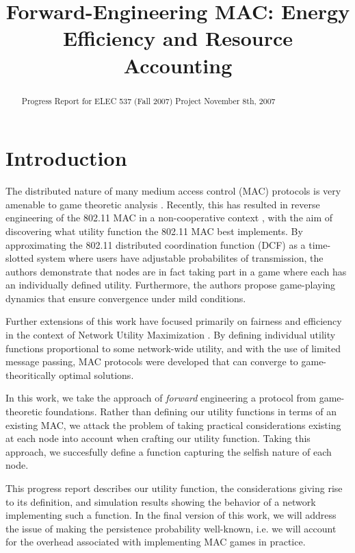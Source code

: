 \documentclass[conference]{IEEEtran}
\theoremstyle{definition}
\begin{document}
\title{Forward-Engineering MAC: Energy Efficiency and Resource Accounting}

\author{
}

\maketitle

\begin{abstract}

Progress Report for ELEC 537 (Fall 2007) Project
November 8th, 2007

\end{abstract}

\section{Introduction}

The distributed nature of many medium access control (MAC) protocols is very amenable to game theoretic analysis \cite{LTHCC07,XSR05}. Recently, this has resulted in reverse engineering of the 802.11 MAC in a non-cooperative context \cite{LTHCC07}, with the aim of discovering what utility function the 802.11 MAC best implements. By approximating the 802.11 distributed coordination function
(DCF) as a time-slotted system where users have adjustable probabilites of transmission, the authors demonstrate that nodes are in fact taking part in a game where each has an individually defined utility. Furthermore, the authors propose game-playing dynamics that ensure convergence under mild conditions.

Further extensions of this work have focused primarily on fairness and efficiency in the context of Network Utility Maximization \cite{LCC07}. By defining individual utility functions proportional to some network-wide utility, and with the use of limited message passing, MAC protocols were developed that can converge to game-theoritically optimal solutions.

In this work, we take the approach of \emph{forward} engineering a protocol from game-theoretic foundations. Rather than defining our utility functions in terms of an existing MAC, we attack the problem of taking practical considerations existing at each node into account when crafting our utility function. Taking this approach, we succesfully define a function capturing the selfish nature of each node.

This progress report describes our utility function, the considerations giving rise to its definition, and simulation results showing the behavior of a network implementing such a function. In the final version of this work, we will address the issue of making the persistence probability well-known, i.e. we will account for the overhead associated with implementing MAC games in practice.
\end{document}
